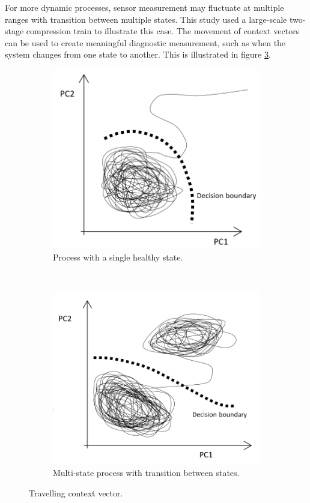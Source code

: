 \documentclass[11pt]{article} %
\theoremstyle{plain}
\theoremstyle{definition}
\begin{document}
For more dynamic processes, sensor measurement may fluctuate at multiple ranges with transition between multiple states. This study used a large-scale two-stage compression train to illustrate this case. The movement of context vectors can be used to create meaningful diagnostic measurement, such as when the system changes from one state to another. This is illustrated in figure \ref{fig:contexttravel2}.

\begin{figure}[H]
	\centering
	\begin{subfigure}[b]{0.35\textwidth}
		\includegraphics[width=\textwidth]{contexttravel.PNG}
		\caption{Process with a single healthy state.}
		\label{fig:contexttravel}
	\end{subfigure}
	~
	\begin{subfigure}[b]{0.35\textwidth}
		\includegraphics[width=\textwidth]{contexttravel2.PNG}
		\caption{Multi-state process with transition between states.}
		\label{fig:contexttravel2}
	\end{subfigure}
	\caption{Travelling context vector.}
\end{figure}
\end{document}
